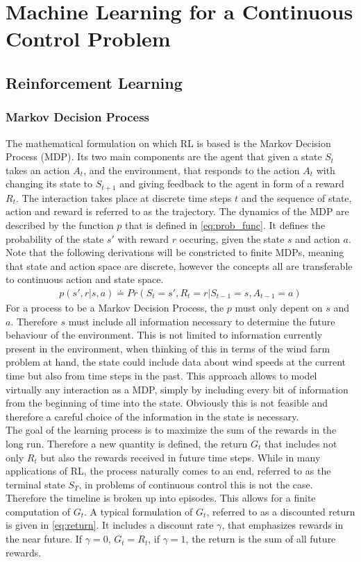 \section{Machine Learning for a Continuous Control Problem}
\subsection{Reinforcement Learning}
\subsubsection{Markov Decision Process}
The mathematical formulation on which RL is based is the Markov Decision Process (MDP). Its two main components are the agent that given a state $S_t$ takes an action $A_t$, and the environment, that responds to the action $A_t$ with changing its state to $S_{t+1}$ and giving feedback to the agent in form of a reward $R_t$. The interaction takes place at discrete time steps $t$ and the sequence of state, action and reward is referred to as the trajectory. The dynamics of the MDP are described by the function $p$ that is defined in \eqref{eq:prob_func}. It defines the probability of the state $s'$ with reward $r$ occuring, given the state $s$ and action $a$. Note that the following derivations will be constricted to finite MDPs, meaning that state and action space are discrete, however the concepts all are transferable to continuous action and state space.
\begin{align}
	p(s',r \vert s,a) \doteq Pr(S_t=s', R_t=r \vert S_{t-1} = s, A_{t-1} = a) \label{eq:prob_func}
\end{align}
For a process to be a Markov Decision Process, the $p$ must only depent on $s$ and $a$. Therefore $s$ must include all information necessary to determine the future behaviour of the environment. This is not limited to information currently present in the environment, when thinking of this in terms of the wind farm problem at hand, the state could include data about wind speeds at the current time but also from time steps in the past. This approach allows to model virtually any interaction as a MDP, simply by including every bit of information from the beginning of time into the state. Obviously this is not feasible and therefore a careful choice of the information in the state is necessary. \\
The goal of the learning process is to maximize the sum of the rewards in the long run. Therefore a new quantity is defined, the return $G_t$ that includes not only $R_t$ but also the rewards received in future time steps. While in many applications of RL, the process naturally comes to an end, referred to as the terminal state $S_T$, in problems of continuous control this is not the case. Therefore the timeline is broken up into episodes. This allows for a finite computation of $G_t$. A typical formulation of $G_t$, referred to as a discounted return is given in \eqref{eq:return}. It includes a discount rate $\gamma$, that emphasizes rewards in the near future. If $\gamma = 0$, $G_t = R_t$, if $\gamma = 1$, the return is the sum of all future rewards. \cite[p. 47- 57]{sutton_reinforcement_2018}

